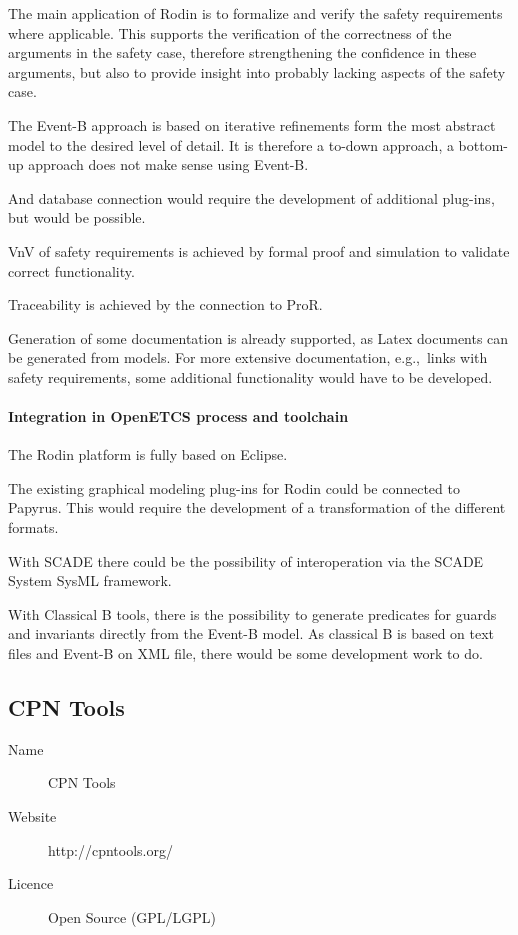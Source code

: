   The main application of Rodin is to formalize and verify the safety
  requirements where applicable. This supports the verification of the
  correctness of the arguments in the safety case, therefore strengthening the
  confidence in these arguments, but also to provide insight into probably
  lacking aspects of the safety case.

 The Event-B approach is based on iterative refinements form the most abstract
  model to the desired level of detail. It is therefore a to-down approach, a
  bottom-up approach does not make sense using Event-B.

  And database connection would require the development of additional plug-ins,
  but would be possible.

  VnV of safety requirements is achieved by formal proof and simulation to
  validate correct functionality.

  Traceability is achieved by the connection to ProR.

  Generation of some documentation is already supported, as Latex documents can
  be generated from models. For more extensive documentation, e.g.,\ links with
  safety requirements, some additional functionality would have to be developed.
\

\paragraph{Integration in OpenETCS process and toolchain}

  The Rodin platform is fully based on Eclipse.

  The existing graphical modeling plug-ins for Rodin could be connected to
  Papyrus. This would require the development of a transformation of the
  different formats.

  With SCADE there could be the possibility of interoperation via the SCADE
  System SysML framework.

  With Classical B tools, there is the possibility to generate predicates for
  guards and invariants directly from the Event-B model. As classical B is based
  on text files and Event-B on XML file, there would be some development work to
  do.
  
 \subsection{CPN Tools}
 \label{sec:CPN}
 
 \begin{description}
 \item[Name] CPN Tools
 \item[Website] http://cpntools.org/
 \item[Licence] Open Source (GPL/LGPL)
 \end{description}
 
